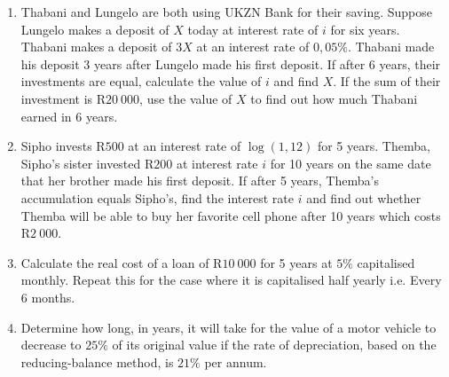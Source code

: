 \begin{eocexercises}{}
\begin{enumerate}
\item{Thabani and Lungelo are both using UKZN Bank for their saving. Suppose Lungelo makes a deposit of $X$ today at interest rate of $i$ for six years. Thabani makes a deposit of $3X$ at an interest rate of $0,05\%$. Thabani made his deposit 3 years after Lungelo made his first deposit. If after 6 years, their investments are equal, calculate the value of $i$ and find $X$. If the sum of their investment is R$20~000$, use the value of $X$ to find out how much Thabani earned in 6 years.}

\item{Sipho invests R$500$ at an interest rate of $\log(1,12)$ for 5 years. Themba, Sipho's sister invested R$200$ at interest rate $i$ for 10 years on the same date that her brother made his first deposit. If after 5 years, Themba's accumulation equals Sipho's, find the interest rate $i$ and find out whether Themba will be able to buy her favorite cell phone after 10 years which costs R$2~000$.}


\item{Calculate the real cost of a loan of R$10~000$ for 5 years at $5\%$ capitalised monthly. Repeat this for the case where it is capitalised half yearly i.e. Every 6 months.}
\item{Determine how long, in years, it will take for the value of a motor vehicle to decrease
to $25\%$ of its original value if the rate of depreciation, based on the reducing-balance
method, is $21\%$ per annum.}


\end{enumerate}
\end{eocexercises}
